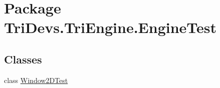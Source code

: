 \hypertarget{namespace_tri_devs_1_1_tri_engine_1_1_engine_test}{\section{Package Tri\-Devs.\-Tri\-Engine.\-Engine\-Test}
\label{namespace_tri_devs_1_1_tri_engine_1_1_engine_test}
}
\subsection*{Classes}
\begin{DoxyCompactItemize}
\item 
class \hyperlink{class_tri_devs_1_1_tri_engine_1_1_engine_test_1_1_window2_d_test}{Window2\-D\-Test}
\end{DoxyCompactItemize}
